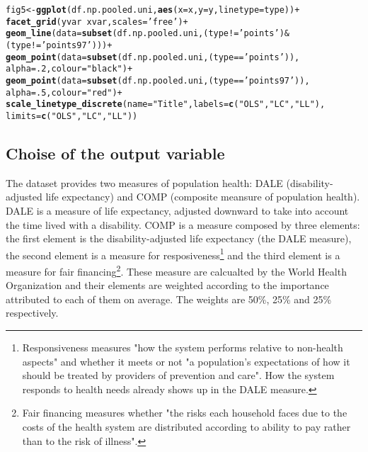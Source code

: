 \documentclass[12pt,a4paper]{article}\usepackage[]{graphicx}\usepackage[]{color}
\makeatletter
\newcommand{\hlnum}[1]{\textcolor[rgb]{0.686,0.059,0.569}{#1}}%
\newcommand{\hlstr}[1]{\textcolor[rgb]{0.192,0.494,0.8}{#1}}%
\newcommand{\hlopt}[1]{\textcolor[rgb]{0,0,0}{#1}}%
\newcommand{\hlstd}[1]{\textcolor[rgb]{0.345,0.345,0.345}{#1}}%
\newcommand{\hlkwb}[1]{\textcolor[rgb]{0.69,0.353,0.396}{#1}}%
\newcommand{\hlkwc}[1]{\textcolor[rgb]{0.333,0.667,0.333}{#1}}%
\newcommand{\hlkwd}[1]{\textcolor[rgb]{0.737,0.353,0.396}{\textbf{#1}}}%
\newenvironment{kframe}{%
 \def\at@end@of@kframe{}%
 \ifinner\ifhmode%
  \def\at@end@of@kframe{\end{minipage}}%
  \begin{minipage}{\columnwidth}%
 \fi\fi%
 \def\FrameCommand##1{\hskip\@totalleftmargin \hskip-\fboxsep
 \colorbox{shadecolor}{##1}\hskip-\fboxsep
     \hskip-\linewidth \hskip-\@totalleftmargin \hskip\columnwidth}%
 \MakeFramed {\advance\hsize-\width
   \@totalleftmargin\z@ \linewidth\hsize
   \@setminipage}}%
 {\par\unskip\endMakeFramed%
 \at@end@of@kframe}
\newenvironment{knitrout}{}{} %
\makeatother
\begin{document}
\begin{knitrout}
\color{fgcolor}\begin{kframe}
\begin{alltt}
\hlstd{fig5} \hlkwb{<-} \hlkwd{ggplot}\hlstd{(df.np.pooled.uni,} \hlkwd{aes}\hlstd{(}\hlkwc{x} \hlstd{= x,} \hlkwc{y} \hlstd{= y,} \hlkwc{linetype} \hlstd{= type))} \hlopt{+}
        \hlkwd{facet_grid}\hlstd{(yvar} \hlopt{~} \hlstd{xvar,} \hlkwc{scales} \hlstd{=} \hlstr{'free'}\hlstd{)} \hlopt{+}
        \hlkwd{geom_line}\hlstd{(}\hlkwc{data} \hlstd{=} \hlkwd{subset}\hlstd{(df.np.pooled.uni, (type} \hlopt{!=} \hlstr{'points'}\hlstd{)}\hlopt{&}\hlstd{(type} \hlopt{!=} \hlstr{'points97'}\hlstd{)))} \hlopt{+}
        \hlkwd{geom_point}\hlstd{(}\hlkwc{data} \hlstd{=} \hlkwd{subset}\hlstd{(df.np.pooled.uni, (type} \hlopt{==} \hlstr{'points'}\hlstd{)),}
                   \hlkwc{alpha} \hlstd{=} \hlnum{.2}\hlstd{,} \hlkwc{colour} \hlstd{=} \hlstr{"black"}\hlstd{)} \hlopt{+}
        \hlkwd{geom_point}\hlstd{(}\hlkwc{data} \hlstd{=} \hlkwd{subset}\hlstd{(df.np.pooled.uni, (type} \hlopt{==} \hlstr{'points97'}\hlstd{)),}
                   \hlkwc{alpha} \hlstd{=} \hlnum{.5}\hlstd{,} \hlkwc{colour} \hlstd{=} \hlstr{"red"}\hlstd{)} \hlopt{+}
        \hlkwd{scale_linetype_discrete}\hlstd{(}\hlkwc{name} \hlstd{=} \hlstr{"Title"}\hlstd{,} \hlkwc{labels} \hlstd{=} \hlkwd{c}\hlstd{(}\hlstr{"OLS"}\hlstd{,} \hlstr{"LC"}\hlstd{,} \hlstr{"LL"}\hlstd{),}
                                \hlkwc{limits} \hlstd{=} \hlkwd{c}\hlstd{(}\hlstr{"OLS"}\hlstd{,} \hlstr{"LC"}\hlstd{,} \hlstr{"LL"}\hlstd{))}
\end{alltt}
\end{kframe}
\end{knitrout}



\subsection{Choise of the output variable}
The dataset provides two measures of population health: DALE (disability-adjusted life expectancy) and COMP (composite meansure of population health). DALE is a measure of life expectancy, adjusted downward to take into account the time lived with a disability. COMP is a measure composed by three elements: the first element is the disability-adjusted life expectancy (the DALE measure), the second element is a measure for resposiveness\footnote{Responsiveness measures "how the system performs relative to non-health aspects" and whether it meets or not "a population's expectations of how it should be treated by providers of prevention and care". How the system responds to health needs already shows up in the DALE measure.} and the third element is a measure for fair financing\footnote{Fair financing measures whether "the risks each household faces due to the costs of the health system are distributed according to ability to pay rather than to the risk of illness".}. These measure are calcualted by the World Health Organization and their elements are weighted according to the importance attributed to each of them on average. The weights are 50\%, 25\% and 25\% respectively. \\
\end{document}

